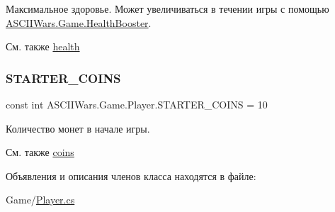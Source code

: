 Максимальное здоровье. Может увеличиваться в течении игры с помощью \hyperlink{class_a_s_c_i_i_wars_1_1_game_1_1_health_booster}{A\+S\+C\+I\+I\+Wars.\+Game.\+Health\+Booster}. 

\begin{DoxySeeAlso}{См. также}
\hyperlink{class_a_s_c_i_i_wars_1_1_game_1_1_player_a8f364a47ef452b6c99bc13b7bdaae7ca}{health} 
\end{DoxySeeAlso}
\hypertarget{class_a_s_c_i_i_wars_1_1_game_1_1_player_af33b6af0d723918290a4a38aa4a6fb66}{}\label{class_a_s_c_i_i_wars_1_1_game_1_1_player_af33b6af0d723918290a4a38aa4a6fb66} 
\subsubsection{\texorpdfstring{S\+T\+A\+R\+T\+E\+R\+\_\+\+C\+O\+I\+NS}{STARTER\_COINS}}
{\footnotesize\ttfamily const int A\+S\+C\+I\+I\+Wars.\+Game.\+Player.\+S\+T\+A\+R\+T\+E\+R\+\_\+\+C\+O\+I\+NS = 10\hspace{0.3cm}{\ttfamily [private]}}



Количество монет в начале игры. 

\begin{DoxySeeAlso}{См. также}
\hyperlink{class_a_s_c_i_i_wars_1_1_game_1_1_player_a5abede19c5428143df924357ad475691}{coins} 
\end{DoxySeeAlso}


Объявления и описания членов класса находятся в файле\+:\begin{DoxyCompactItemize}
\item 
Game/\hyperlink{_player_8cs}{Player.\+cs}\end{DoxyCompactItemize}
